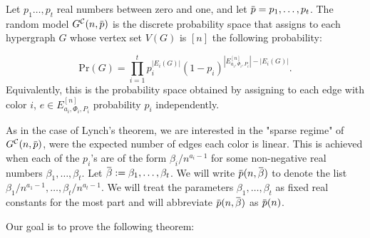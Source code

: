 \documentclass[12pt,notitlepage,a4paper]{article}
\theoremstyle{definition}
\newcommand{\Ln}{\lim\limits_{n\to \infty}}
\newcommand{\overbar}[1]{\mkern 1.5mu\overline{\mkern-1.5mu#1\mkern-1.5mu}\mkern 1.5mu}
\begin{document}
Let $p_1\dots,p_t$ real numbers between zero and one,
and let $\overbar{p}=p_1,\dots,p_t$.
The random model $G^{\mathcal{C}}(n,\overbar{p})$ 
is the discrete probability space that
assigns to each hypergraph $G$ whose vertex
set $V(G)$ is $[n]$ the following probability:

\[ \mathrm{Pr}(G)=\prod_{i=1}^{t} p_i^{|E_i(G)|}
(1-p_i)^{ |E^{[n]}_{a_i,\Phi_i,P_i}|-|E_i(G)|}.	
\]
Equivalently, this is the probability space obtained by 
assigning to each edge with color $i$,  
$e\in  E^{[n]}_{a_i,\Phi_i,P_i}$ probability 
$p_i$ independently. \par

As in the case of Lynch's theorem, we are interested in the
"sparse regime" of $G^\mathcal{C}(n,\overbar{p})$, were the 
expected number of edges each color is linear. 
This is achieved when each of the $p_i$'s are 
of the form $\beta_i/n^{a_i-1}$ for some 
non-negative real numbers $\beta_1,\dots,\beta_t$.
Let $\overbar{\beta}:=\beta_1,\dots,\beta_t$.
We will write $\overbar{p}(n,\overbar{\beta})$ to denote 
the list $\beta_1/n^{a_1-1},\dots, \beta_t/n^{a_t-1}$.
We will treat
the parameters $\beta_1,\dots, \beta_t$ as fixed
real constants for the most part and will abbreviate 
$\overbar{p}(n,\overbar{\beta})$ as $\overbar{p}(n)$.\par

Our goal is to prove the following theorem:
\end{document}
